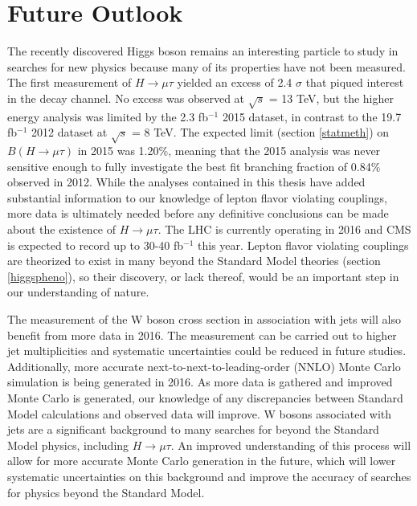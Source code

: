 \documentclass[oneside, letterpaper, oldfontcommands]{memoir}
\let\oldbib
\renewcommand*{}{\SingleSpace\oldbib}
\begin{document}
\section{Future Outlook}
\qquad The recently discovered Higgs boson remains an interesting particle to study in searches for new physics because many of its properties have not been measured. The first measurement of $H \rightarrow \mu\tau$ yielded an excess of 2.4 $\sigma$ that piqued interest in the decay channel. No excess was observed at $\sqrt{s}$ = 13 TeV, but the higher energy analysis was limited by the 2.3 fb$^{-1}$ 2015 dataset, in contrast to the 19.7 fb$^{-1}$ 2012 dataset at $\sqrt{s}$ = 8 TeV. The expected limit (section \ref{statmeth}) on $B(H \rightarrow \mu \tau)$ in 2015 was 1.20\%, meaning that the 2015 analysis was never sensitive enough to fully investigate the best fit branching fraction of 0.84\% observed in 2012. While the analyses contained in this thesis have added substantial information to our knowledge of lepton flavor violating couplings, more data is ultimately needed before any definitive conclusions can be made about the existence of $H \rightarrow \mu\tau$. The LHC is currently operating in 2016 and CMS is expected to record up to 30-40 fb$^{-1}$ this year. Lepton flavor violating couplings are theorized to exist in many beyond the Standard Model theories (section \ref{higgspheno}), so their discovery, or lack thereof, would be an important step in our understanding of nature.


\qquad The measurement of the W boson cross section in association with jets will also benefit from more data in 2016. The measurement can be carried out to higher jet multiplicities and systematic uncertainties could be reduced in future studies. Additionally, more accurate next-to-next-to-leading-order (NNLO) Monte Carlo simulation is being generated in 2016. As more data is gathered and improved Monte Carlo is generated, our knowledge of any discrepancies between Standard Model calculations and observed data will improve. W bosons associated with jets are a significant background to many searches for beyond the Standard Model physics, including $H \rightarrow \mu\tau$. An improved understanding of this process will allow for more accurate Monte Carlo generation in the future, which will lower systematic uncertainties on this background and improve the accuracy of searches for physics beyond the Standard Model.



%
%


\end{document}

